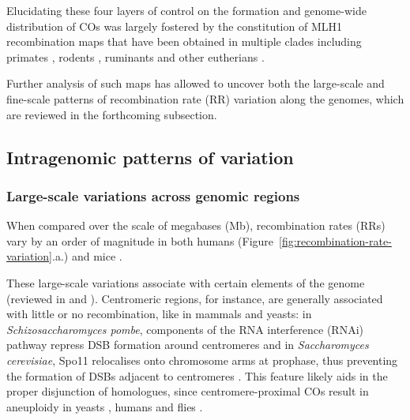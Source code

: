 Elucidating these four layers of control on the formation and genome-wide distribution of COs was largely fostered by the constitution of MLH1 recombination maps \citep[reviewed in][]{capilla2016mammalian} that have been obtained in multiple clades including primates \citep[e.g.][]{sun2005variation,gruhn2013cytological}, rodents \citep[e.g.][]{froenicke2002male,dumont2011genetic}, ruminants \citep[e.g.][]{vozdova2013comparative,sebestova2016effect} and other eutherians \citep[e.g.][]{borodin2008recombination,segurajoana2013evolution,mary2014meiotic}.

Further analysis of such maps has allowed to uncover both the large-scale and fine-scale patterns of recombination rate (RR) variation along the genomes, which are reviewed in the forthcoming subsection.




\subsection{Intragenomic patterns of variation}

\subsubsection{Large-scale variations across genomic regions}

When compared over the scale of megabases (Mb), recombination rates (RRs) vary by an order of magnitude in both humans (Figure~\ref{fig:recombination-rate-variation}.a.) \citep{nachman2002variation,myers2005finescale} and mice \citep{billings2010patterns, morgan2017structural}.

These large-scale variations associate with certain elements of the genome (reviewed in \citealp{demassy2013initiation} and \citealp{lam2015mechanism}).
Centromeric regions, for instance, are generally associated with little or no recombination, like in mammals \citep{qiao2012interplay} and yeasts: in \textit{Schizosaccharomyces pombe}, components of the RNA interference (RNAi) pathway repress DSB formation around centromeres \citep{ellermeier2010rnai} and in \textit{Saccharomyces cerevisiae}, Spo11 relocalises onto chromosome arms at prophase, thus preventing the formation of DSBs adjacent to centromeres \citep{kugou2009rec8}.
This feature likely aids in the proper disjunction of homologues, since centromere-proximal COs result in aneuploidy in yeasts \citep{rockmill2006centromereproximal}, humans \citep{hassold2001err} and flies \citep{koehler1996recombination}.

